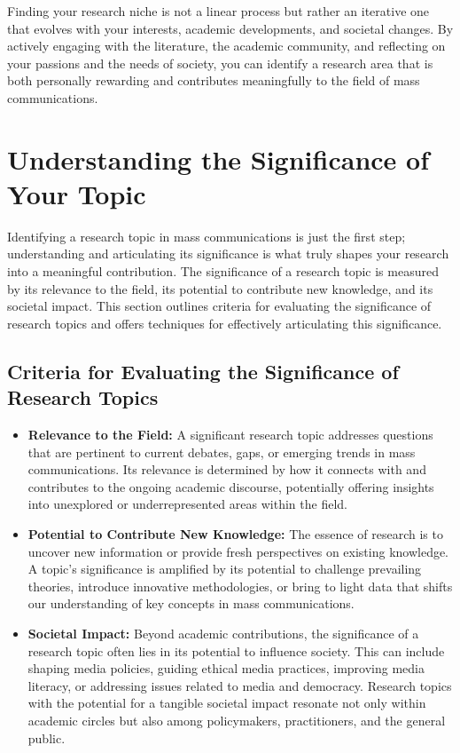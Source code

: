 \documentclass[
]{book}
\begin{document}
Finding your research niche is not a linear process but rather an iterative one that evolves with your interests, academic developments, and societal changes. By actively engaging with the literature, the academic community, and reflecting on your passions and the needs of society, you can identify a research area that is both personally rewarding and contributes meaningfully to the field of mass communications.

\hypertarget{understanding-the-significance-of-your-topic}{%
\section{Understanding the Significance of Your Topic}\label{understanding-the-significance-of-your-topic}}

Identifying a research topic in mass communications is just the first step; understanding and articulating its significance is what truly shapes your research into a meaningful contribution. The significance of a research topic is measured by its relevance to the field, its potential to contribute new knowledge, and its societal impact. This section outlines criteria for evaluating the significance of research topics and offers techniques for effectively articulating this significance.

\hypertarget{criteria-for-evaluating-the-significance-of-research-topics}{%
\subsection*{Criteria for Evaluating the Significance of Research Topics}\label{criteria-for-evaluating-the-significance-of-research-topics}}

\begin{itemize}
\item
  \textbf{Relevance to the Field:} A significant research topic addresses questions that are pertinent to current debates, gaps, or emerging trends in mass communications. Its relevance is determined by how it connects with and contributes to the ongoing academic discourse, potentially offering insights into unexplored or underrepresented areas within the field.
\item
  \textbf{Potential to Contribute New Knowledge:} The essence of research is to uncover new information or provide fresh perspectives on existing knowledge. A topic's significance is amplified by its potential to challenge prevailing theories, introduce innovative methodologies, or bring to light data that shifts our understanding of key concepts in mass communications.
\item
  \textbf{Societal Impact:} Beyond academic contributions, the significance of a research topic often lies in its potential to influence society. This can include shaping media policies, guiding ethical media practices, improving media literacy, or addressing issues related to media and democracy. Research topics with the potential for a tangible societal impact resonate not only within academic circles but also among policymakers, practitioners, and the general public.
\end{itemize}
\end{document}
